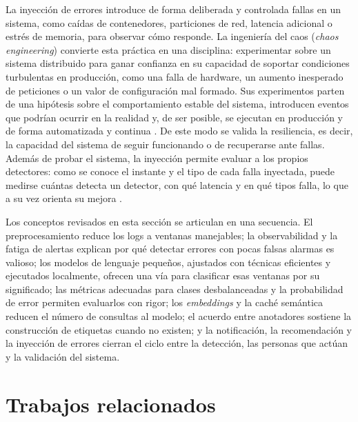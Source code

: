 La inyección de errores introduce de forma deliberada y controlada fallas en un sistema, como caídas de contenedores, particiones de red, latencia adicional o estrés de memoria, para observar cómo responde. La ingeniería del caos (\textit{chaos engineering}) convierte esta práctica en una disciplina: experimentar sobre un sistema distribuido para ganar confianza en su capacidad de soportar condiciones turbulentas en producción, como una falla de hardware, un aumento inesperado de peticiones o un valor de configuración mal formado. Sus experimentos parten de una hipótesis sobre el comportamiento estable del sistema, introducen eventos que podrían ocurrir en la realidad y, de ser posible, se ejecutan en producción y de forma automatizada y continua \cite{basiri2016_chaos}. De este modo se valida la resiliencia, es decir, la capacidad del sistema de seguir funcionando o de recuperarse ante fallas. Además de probar el sistema, la inyección permite evaluar a los propios detectores: como se conoce el instante y el tipo de cada falla inyectada, puede medirse cuántas detecta un detector, con qué latencia y en qué tipos falla, lo que a su vez orienta su mejora \cite{pedroso2025_maia}.

Los conceptos revisados en esta sección se articulan en una secuencia. El preprocesamiento reduce los logs a ventanas manejables; la observabilidad y la fatiga de alertas explican por qué detectar errores con pocas falsas alarmas es valioso; los modelos de lenguaje pequeños, ajustados con técnicas eficientes y ejecutados localmente, ofrecen una vía para clasificar esas ventanas por su significado; las métricas adecuadas para clases desbalanceadas y la probabilidad de error permiten evaluarlos con rigor; los \textit{embeddings} y la caché semántica reducen el número de consultas al modelo; el acuerdo entre anotadores sostiene la construcción de etiquetas cuando no existen; y la notificación, la recomendación y la inyección de errores cierran el ciclo entre la detección, las personas que actúan y la validación del sistema.

\section{Trabajos relacionados}\label{cap:trabajos_relacionados}

